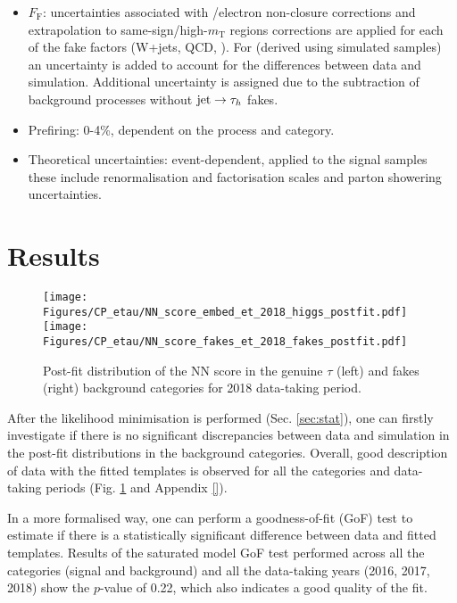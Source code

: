 \begin{itemize}
    \item $F_\text{F}$: uncertainties associated with \met/electron \pt non-closure corrections and extrapolation to same-sign/high-$m_\text{T}$ regions corrections are applied for each of the fake factors (W+jets, QCD, \ttbar). For \ttbar \ff (derived using simulated samples) an uncertainty is added to account for the differences between data and simulation. Additional uncertainty is assigned due to the subtraction of background processes without $\text{jet}\to\tau_h$ fakes.
    \item Prefiring: 0-4\%, dependent on the process and category.
    \item Theoretical uncertainties: event-dependent, applied to the signal samples these include renormalisation and factorisation scales and parton showering uncertainties.
\end{itemize}

\section{Results}\label{sec:results}

\begin{figure}[h!]
    \centering
    \texttt{[image: Figures/CP\_etau/NN\_score\_embed\_et\_2018\_higgs\_postfit.pdf]}
    \texttt{[image: Figures/CP\_etau/NN\_score\_fakes\_et\_2018\_fakes\_postfit.pdf]}
    \caption{Post-fit distribution of the NN score in the genuine $\tau$ (left) and fakes (right) background categories for 2018 data-taking period.}
    \label{fig:bkgr_cat_postfit}
\end{figure}

After the likelihood minimisation is performed (Sec. \ref{sec:stat}), one can firstly investigate if there is no significant discrepancies between data and simulation in the post-fit distributions in the background categories. Overall, good description of data with the fitted templates is observed for all the categories and data-taking periods (Fig. \ref{fig:bkgr_cat_postfit} and Appendix \ref{}).

In a more formalised way, one can perform a goodness-of-fit (GoF) test to estimate if there is a statistically significant difference between data and fitted templates. Results of the saturated model GoF test \cite{Cousins2013GeneralizationOC} performed across all the categories (signal and background) and all the data-taking years (2016, 2017, 2018) show the $p$-value of 0.22, which also indicates a good quality of the fit.

